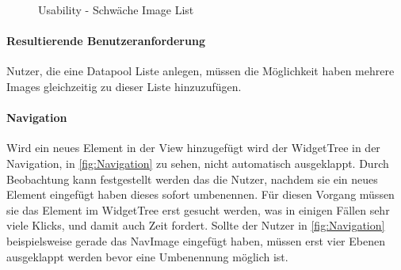 \begin{figure}
 \qquad
  \caption{Usability - Schwäche Image List}%
  \label{fig:ImageList}
\end{figure}

\paragraph{Resultierende Benutzeranforderung}
Nutzer, die eine Datapool Liste anlegen, müssen die Möglichkeit haben mehrere Images gleichzeitig zu dieser Liste hinzuzufügen.


\paragraph{Navigation}
Wird ein neues Element in der View hinzugefügt wird der WidgetTree in der Navigation, in \cref{fig:Navigation} zu sehen, nicht automatisch ausgeklappt.
Durch Beobachtung kann festgestellt werden das die Nutzer, nachdem sie ein neues Element eingefügt haben dieses sofort umbenennen. 
Für diesen Vorgang müssen sie das Element im WidgetTree erst gesucht werden, was in einigen Fällen sehr viele Klicks, und damit auch Zeit fordert.
Sollte der Nutzer in \cref{fig:Navigation} beispielsweise gerade das NavImage eingefügt haben, müssen erst vier Ebenen ausgeklappt werden bevor eine Umbenennung möglich ist.

